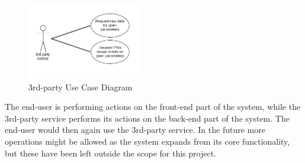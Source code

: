 \documentclass[11pt,a4paper,titlepage,oneside]{report}
\begin{document}
  \begin{figure}[h]
	\begin{center}
	\includegraphics[height=125px,width=186px]{img/useCase_3rdParty.png}
	\caption{3rd-party Use Case Diagram}
	\label{fig:3rdPartyUseDiagram}
	\small
	\end{center}
  \end{figure}

    The end-user is performing actions on the front-end part of the system, while the 3rd-party service performs its actions on the back-end part of the system. The end-user would then again use the 3rd-party service. In the future more operations might be allowed as the system expands from its core functionality, but these have been left outside the scope for this project.
\end{document}
